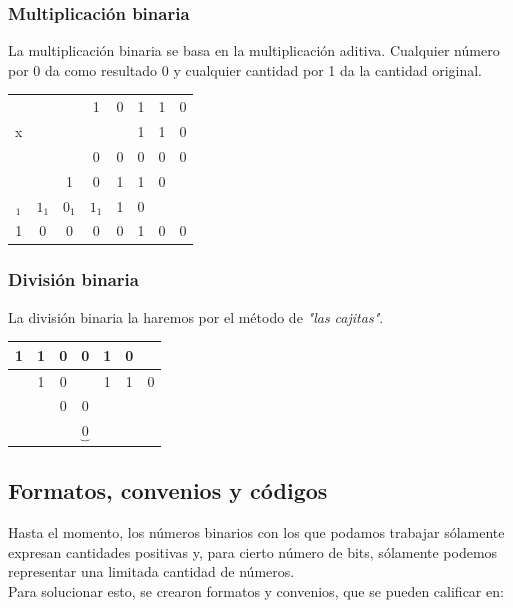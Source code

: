 \documentclass[12pt]{article}
\begin{document}
				\subsubsection{Multiplicación binaria}
			
					La multiplicación binaria se basa en la multiplicación aditiva. Cualquier número por 0 da como resultado 0 y cualquier cantidad por 1 da la cantidad original.\\
				
					\begin{table}[H]
						\centering
						\begin{tabular}{cccccccc}
							&   &   & 1 & 0 & 1 & 1 & 0 \\
						  x &   &   &   &   & 1 & 1 & 0 \\
							\toprule
							&   &   & 0 & 0 & 0 & 0 & 0 \\
							&   & 1 & 0 & 1 & 1 & 0 &   \\
							${}_{1}$ & ${1}_{1}$ & ${0}_{1}$ & ${1}_{1}$ & 1 & 0 &   &   \\
							\midrule
							1 & 0 & 0 & 0 & 0 & 1 & 0 & 0 \\
						\end{tabular}
					\end{table}
				
				\subsubsection{División binaria}
			
					La división binaria la haremos por el método de \textit{"las cajitas"}.\\
				
					\begin{table}[H]
						\centering
						\begin{tabular}{cccc|ccc}
							1 & 1 & 0 & 0 & 1 & 0 &   \\
							\toprule
							  & 1 & 0 &   & 1 & 1 & 0 \\
							  &   & 0 & 0 \\
							  &   &   & $\underbrace{0}$ \\
						\end{tabular}
					\end{table}
					
					\newpage
				
			\subsection{Formatos, convenios y códigos}
			
				Hasta el momento, los números binarios con los que podamos trabajar sólamente expresan cantidades positivas y, para cierto número de bits, sólamente podemos representar una limitada cantidad de números.\\
				
				Para solucionar esto, se crearon formatos y convenios, que se pueden calificar en:\\
			
				
\end{document}
